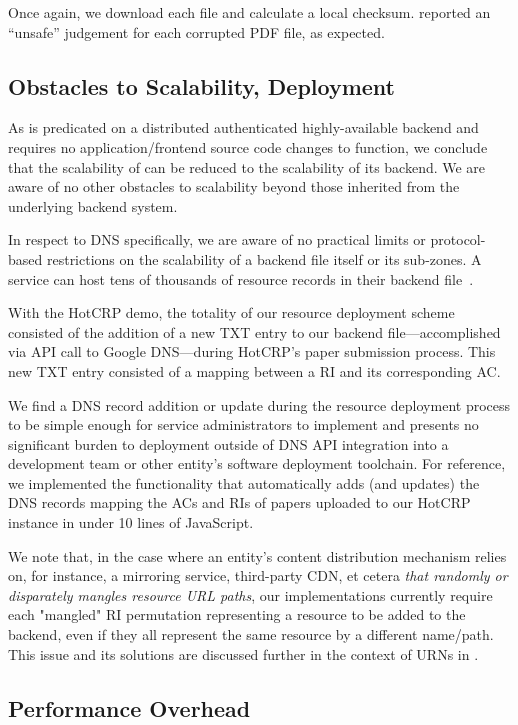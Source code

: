 Once again, we download each file and calculate a local checksum. \DHTSYS{}
reported an ``unsafe'' judgement for each corrupted PDF file, as expected.

\subsection{Obstacles to Scalability, Deployment}

As \SYSTEM{} is predicated on a distributed authenticated highly-available
backend and requires no application/frontend source code changes to function, we
conclude that the scalability of \SYSTEM{} can be reduced to the scalability of
its backend. We are aware of no other obstacles to scalability beyond those
inherited from the underlying backend system.

In respect to DNS specifically, we are aware of no practical limits or
protocol-based restrictions on the scalability of a backend file itself or its
sub-zones. A service can host tens of thousands of resource records in their
backend file~\cite{DNS1, DNS2}.

With the HotCRP demo, the totality of our resource deployment scheme consisted
of the addition of a new TXT entry to our backend file---accomplished via API
call to Google DNS---during HotCRP's paper submission process. This new TXT
entry consisted of a mapping between a RI and its corresponding AC.

We find a DNS record addition or update during the resource deployment process
to be simple enough for service administrators to implement and presents no
significant burden to deployment outside of DNS API integration into a
development team or other entity's software deployment toolchain. For reference,
we implemented the functionality that automatically adds (and updates) the DNS
records mapping the ACs and RIs of papers uploaded to our HotCRP instance in
under 10 lines of JavaScript.

We note that, in the case where an entity's content distribution mechanism
relies on, for instance, a mirroring service, third-party CDN, et cetera
\emph{that randomly or disparately mangles resource URL paths}, our
implementations currently require each "mangled" RI permutation
representing a resource to be added to the backend, even if they all represent
the same resource by a different name/path. This issue and its solutions are
discussed further in the context of URNs in .

\subsection{Performance Overhead}

